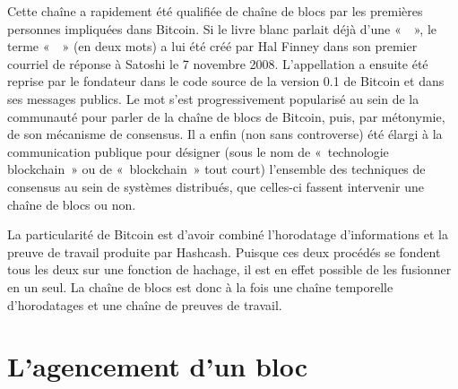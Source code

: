 Cette chaîne a rapidement été qualifiée de chaîne de blocs par les premières personnes impliquées dans Bitcoin. Si le livre blanc parlait déjà d'une «~~», le terme «~~» (en deux mots) a lui été créé par Hal Finney dans son premier courriel de réponse à Satoshi le 7 novembre 2008. L'appellation a ensuite été reprise par le fondateur dans le code source de la version 0.1 de Bitcoin et dans ses messages publics. Le mot  s'est progressivement popularisé au sein de la communauté pour parler de la chaîne de blocs de Bitcoin, puis, par métonymie, de son mécanisme de consensus. Il a enfin (non sans controverse) été élargi à la communication publique pour désigner (sous le nom de «~technologie blockchain~» ou de «~blockchain~» tout court) l'ensemble des techniques de consensus au sein de systèmes distribués, que celles-ci fassent intervenir une chaîne de blocs ou non.

La particularité de Bitcoin est d'avoir combiné l'horodatage d'informations et la preuve de travail produite par Hashcash. Puisque ces deux procédés se fondent tous les deux sur une fonction de hachage, il est en effet possible de les fusionner en un seul. La chaîne de blocs est donc à la fois une chaîne temporelle d'horodatages et une chaîne de preuves de travail.

\section*{L'agencement d'un bloc} %


